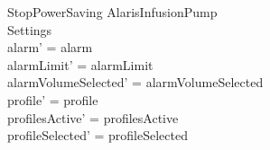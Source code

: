 \begin{schema}{StopPowerSaving}
	\Delta AlarisInfusionPump\\
	Settings\\
	\where
	alarm' = alarm\\
	alarmLimit' = alarmLimit\\
	alarmVolumeSelected' = alarmVolumeSelected\\
	profile' = profile\\
	profilesActive' = profilesActive\\  
	  profileSelected' = profileSelected\\
	  

\end{schema}

